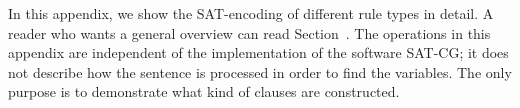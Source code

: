 \def\sobre{\text{\em sobre}}
\def\una{\text{\em una}}
\def\aproximacion{\text{ \em aproximaci\'{o}n}}
\def\mas{\text{\em m\'{a}s}}
\def\cientifica{\text{\em cient\'{\i}fica}}


\def\vPrsPThree{\text{\em PrsP3}}
\def\vPrsPOne{\text{\em PrsP1}}
\def\vImpPThree{\text{\em ImpP3}}
\def\adj{{\text{\em Adj}}}
\def\adv{{\text{\em Adv}}}
\def\n{\text{\em N}}
\def\pr{{\text{\em Pr}}}
\def\prn{{\text{\em Prn}}}
\def\det{{\text{\em Det}}}
\def\notDet{{\neg \text{\em Det}}}
\def\any{{\text{Any}}}


\def\sobrePr{\sobre_\pr}
\def\sobreN{\sobre_\n}

\def\unaNotDet{\una_\notDet}
\def\unaAny{\una_\any}
\def\unaPrn{\una_\prn}
\def\unaDet{\una_\det}
\def\unaPrsPThree{\una_\vPrsPThree}
\def\unaPrsPOne{\una_\vPrsPOne}
\def\unaImp{\una_\vImpPThree}
\def\aproximacionN{\aproximacion_\n}
\def\masAdv{\mas_\adv}
\def\masAdj{\mas_\adj}
\def\cientificaAdj{\cientifica_\adj}
\def\cientificaN{\cientifica_\n}

\def\cgrule#1{\noindent {\bf  #1 }}
\def\eqdef{\Coloneqq}
\def\impl{\quad\Longrightarrow\quad}

\def\ob#1{\overbrace{ #1 \rule{0pt}{2ex}}}







\noindent In this appendix, we show the SAT-encoding of different rule types in detail. 
A reader who wants a general overview can read Section~.
The operations in this appendix are independent of the implementation of the software SAT-CG; it does not describe how the sentence is processed in order to find the variables.
The only purpose is to demonstrate what kind of clauses are constructed.

